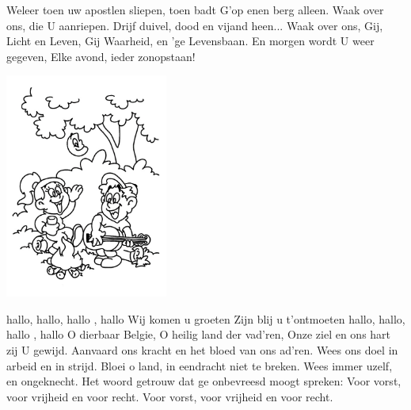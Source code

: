 \documentclass{article}
\begin{document}
\begin{songs}{}
\beginverse
Weleer toen uw apostlen sliepen, toen badt G'op enen berg alleen. Waak over ons, die U aanriepen. Drijf duivel, dood en vijand heen... Waak over ons, Gij, Licht en Leven, Gij Waarheid, en 'ge Levensbaan. En morgen wordt U weer gegeven, Elke avond, ieder zonopstaan!
\endverse
\endsong
\begin{intersong}
    \includegraphics[width=0.4\textwidth]{img6}
\end{intersong}
\beginverse*
hallo, hallo, hallo , hallo
Wij komen u groeten
Zijn blij u t'ontmoeten
hallo, hallo, hallo , hallo
\endverse
\endsong
{}
\beginverse*
O dierbaar Belgie, O heilig land der vad'ren, Onze ziel en ons hart zij U gewijd.
Aanvaard ons kracht en het bloed van ons ad'ren. Wees ons doel in arbeid en in strijd.
Bloei o land, in eendracht niet te breken. Wees immer uzelf, en ongeknecht.
Het woord getrouw dat ge onbevreesd moogt spreken: Voor vorst, voor vrijheid en voor recht.
Voor vorst, voor vrijheid en voor recht.


\end{songs}
\end{document}
